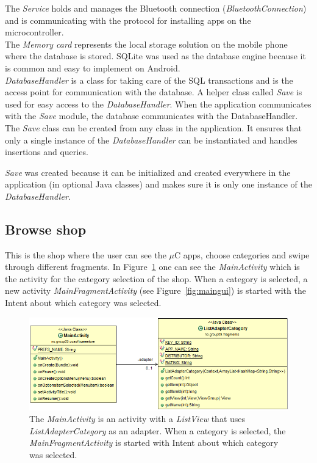	The \textit{Service} holds and manages the Bluetooth connection (\textit{BluetoothConnection}) and is communicating with the protocol for installing apps on the microcontroller. \\

	The \textit{Memory card} represents the local storage solution on the mobile phone where the database is stored. SQLite was used as the database engine because it is common and easy to implement on Android.\\

	\textit{DatabaseHandler} is a class for taking care of the SQL transactions and is the access point for communication with the database. A helper class called \textit{Save} is used for easy access to the \textit{DatabaseHandler}.
	When the application communicates with the \textit{Save} module, the database communicates with the DatabaseHandler. The \textit{Save} class can be created from any class in the application. It ensures that only a single instance of the \textit{DatabaseHandler} can be instantiated and handles insertions and queries.

	\textit{Save} was created because it can be initialized and created everywhere in the application (in optional Java classes) and makes sure it is only one instance of the \textit{DatabaseHandler}.

	\subsection{Browse shop}
	This is the shop where the user can see the $\mu$C apps, choose categories and swipe through different fragments. In  Figure~\ref{fig:categoriesuml} one can see the \textit{MainActivity} which is the activity for the category selection of the shop. When a category is selected, a new activity \textit{MainFragmentActivity} (see Figure~\ref{fig:maingui}) is started with the Intent about which category was selected.

	\begin{figure}[H]
	\centering
	\includegraphics[scale=0.85]{images/UML/categories.png}
	\caption[UML - Categories]{The \textit{MainActivity} is an activity with a \textit{ListView} that uses \textit{ListAdapterCategory} as an adapter. When a category is selected, the \textit{MainFragmentActivity} is started with Intent about which category was selected.}
	\label{fig:categoriesuml}
	\end{figure}


